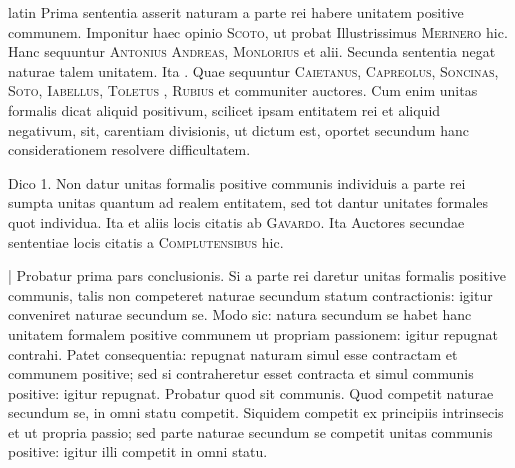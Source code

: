 \begin{otherlanguage*}{latin}
\pstart
 Prima sententia asserit naturam a parte rei habere unitatem positive communem. Imponitur haec opinio \textsc{Scoto}, ut probat Illustrissimus \textsc{Merinero}\index[persons]{} hic. Hanc sequuntur \textsc{Antonius Andreas}, \textsc{Monlorius}  et alii. Secunda sententia negat naturae talem unitatem. Ita . Quae sequuntur \textsc{Caietanus}, \textsc{Capreolus}, \textsc{Soncinas}, \textsc{Soto}, \textsc{Iabellus}, \textsc{Toletus} , \textsc{Rubius} et communiter auctores. Cum enim unitas formalis dicat aliquid positivum, scilicet ipsam entitatem rei et aliquid negativum, sit, carentiam divisionis, ut dictum est, oportet secundum hanc considerationem resolvere difficultatem. 
\pend

\pstart
 Dico 1. Non datur unitas formalis positive communis individuis a parte rei sumpta unitas quantum ad realem entitatem, sed tot dantur unitates formales quot individua. Ita  et aliis locis citatis ab \textsc{Gavardo}. Ita Auctores secundae sententiae locis citatis a \textsc{Complutensibus}\index[persons]{} hic. 
\pend

\pstart
 \textnormal{|} Probatur prima pars conclusionis. Si a parte rei daretur unitas formalis positive communis, talis non competeret naturae secundum statum contractionis: igitur conveniret naturae secundum se. Modo sic: natura secundum se habet hanc unitatem formalem positive communem ut propriam passionem: igitur repugnat contrahi. Patet consequentia: repugnat naturam simul esse contractam et communem positive; sed si contraheretur esset contracta et simul communis positive: igitur repugnat. Probatur quod sit communis. Quod competit naturae secundum se, in omni statu competit. Siquidem competit ex principiis intrinsecis et ut propria passio; sed parte naturae secundum se competit unitas communis positive: igitur illi competit in omni statu. 
\pend


\end{otherlanguage*}
